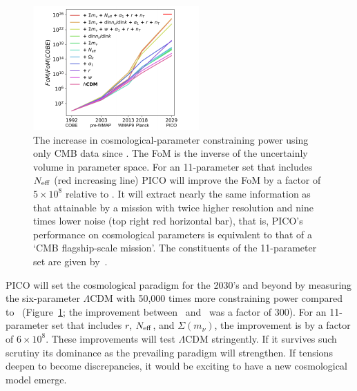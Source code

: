 \documentclass[PICOAPC.tex]{subfiles}
\begin{document}
\begin{figure}[h]
\hspace{-0.2in}
\parbox{2.6in}{\centerline {
\includegraphics[width=2.5in]{images/fom_plot_CVL+del.pdf} } }
\hspace{-0.17in}
\parbox{4.1in}{
\caption{\captiontext 
The increase in cosmological-parameter constraining power using only CMB data since \cobe . The FoM is the inverse of the uncertainly volume in parameter space. 
For an 11-parameter set that includes ${N_{\rm eff}}$ (red increasing line) PICO will improve the FoM by a factor of $5\times10^{8}$ relative to \planck . It will extract nearly the same information as that attainable by a mission with twice higher resolution and nine times lower noise (top right red horizontal bar), that is, PICO's performance on cosmological parameters is equivalent to that of a `CMB flagship-scale mission'. The constituents of the 11-parameter set are given by~\citet{pico_report}. 
\label{fig:fom} } }
\vspace{-0.1in}
\end{figure}

PICO will set the cosmological paradigm for the 2030's and beyond by measuring the six-parameter $\Lambda$CDM with 50,000 times more constraining power compared to \planck\ (Figure~\ref{fig:fom}; the improvement between \wmap\ and \planck\ was a factor of 300). For an 11-parameter set that includes $r$, ${N_{\rm eff}}$, and $\Sigma (m_{\nu})$, the improvement is by a factor of $6\times10^{8}$. These improvements will test $\Lambda$CDM stringently. If it survives such scrutiny its dominance as the prevailing paradigm will strengthen. If tensions deepen to become discrepancies, it would be exciting to have a new cosmological model emerge. 
\end{document}

